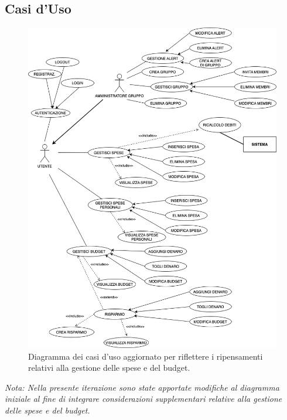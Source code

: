 \subsection{Casi d'Uso}

    \begin{figure}[h]
        \centering
        \includegraphics[scale=0.35]{images/DiagrammaCasiDusoV2.png}
        \caption{Diagramma dei casi d'uso aggiornato per riflettere i ripensamenti relativi alla gestione delle spese e del budget.}
    \end{figure}
    \textit{Nota: Nella presente iterazione sono state apportate modifiche al diagramma iniziale al fine di integrare considerazioni supplementari relative alla gestione delle spese e del budget.}
